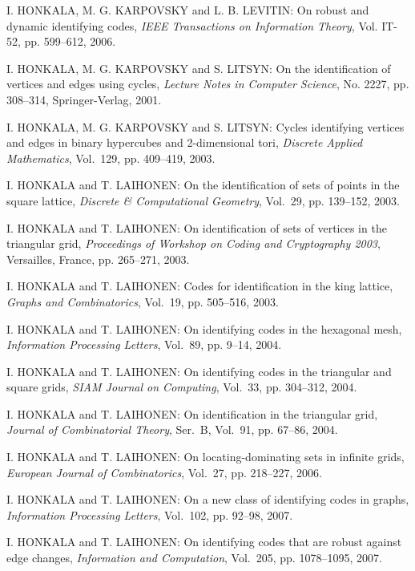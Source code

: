 \begin{thebibliography}{999}
I. HONKALA, M. G. KARPOVSKY and L. B. LEVITIN: On robust and dynamic identifying codes, {\it IEEE Transactions on Information Theory}, Vol. IT-52, pp. 599--612, 2006.

I. HONKALA, M. G. KARPOVSKY and S. LITSYN: On the identification of vertices and edges using cycles, {\it Lecture Notes in Computer Science}, No. 2227, pp. 308--314, Springer-Verlag, 2001.

I. HONKALA, M. G. KARPOVSKY and S. LITSYN: Cycles identifying vertices and edges in binary hypercubes and 2-dimensional tori, {\it Discrete Applied Mathematics}, Vol.~129, pp. 409--419, 2003.

I. HONKALA and T. LAIHONEN: On the identification of sets of points in the square lattice, {\it Discrete \& Computational Geometry}, Vol.~29, pp. 139--152, 2003.

I. HONKALA and T. LAIHONEN: On identification of sets of vertices in the triangular grid, {\it Proceedings of Workshop on Coding and Cryptography 2003}, Versailles, France, pp. 265--271, 2003.

I. HONKALA and T. LAIHONEN: Codes for identification in the king lattice, {\it Graphs and Combinatorics}, Vol.~19, pp. 505--516, 2003.

I. HONKALA and T. LAIHONEN: On identifying codes in the hexagonal mesh, {\it Information Processing Letters}, Vol.~89, pp. 9--14, 2004.

I. HONKALA and T. LAIHONEN: On identifying codes in the triangular and square grids, {\it SIAM Journal on Computing}, Vol.~33, pp. 304--312, 2004.

I. HONKALA and T. LAIHONEN: On identification in the triangular grid, {\it Journal of Combinatorial Theory}, Ser.~B, Vol.~91, pp. 67--86, 2004.

I. HONKALA and T. LAIHONEN: On locating-dominating sets in infinite grids, {\it European Journal of Combinatorics}, Vol.~27, pp. 218--227, 2006.

I. HONKALA and T. LAIHONEN: On a new class of identifying codes in graphs, {\it Information Processing Letters}, Vol.~102, pp. 92--98, 2007.

I. HONKALA and T. LAIHONEN: On identifying codes that are robust against edge changes, {\it Information and Computation}, Vol.~205, pp. 1078--1095, 2007.


\end{thebibliography}
